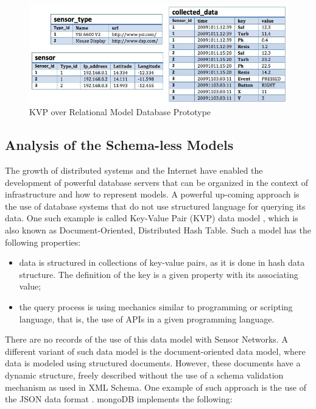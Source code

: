 \begin{figure}[!h]
  \centering
  \includegraphics[scale=0.75]{../diagrams/persistence-example-relational-kvp}
  \caption{KVP over Relational Model Database Prototype}
  \label{fig:persistence-example-relational-kvp}
\end{figure}

\subsection{Analysis of the Schema-less Models}

The growth of distributed systems and the Internet have enabled the development
of powerful database servers that can be organized in the context of
infrastructure and how to represent models. A powerful up-coming approach is
the use of database systems that do not use structured language for querying
its data. One such example is called Key-Value Pair (KVP) data model
\cite{db-kvp}, which is also known as Document-Oriented, Distributed Hash
Table. Such a model has the following properties:

\begin{itemize}
  \item data is structured in collections of key-value pairs, as it is done in
  hash data structure. The definition of the key is a given property with its
  associating value;
  \item the query process is using mechanics similar to programming or
  scripting language, that is, the use of APIs in a given programming language.
\end{itemize}

There are no records of the use of this data model with Sensor Networks.
A different variant of such data model is the document-oriented data model,
where data is modeled using structured documents. However, these documents
have a dynamic structure, freely described without the use of a
schema validation mechanism as used in XML Schema. One example of such
approach is the use of the JSON data format \cite{json}. mongoDB implements the
following:

